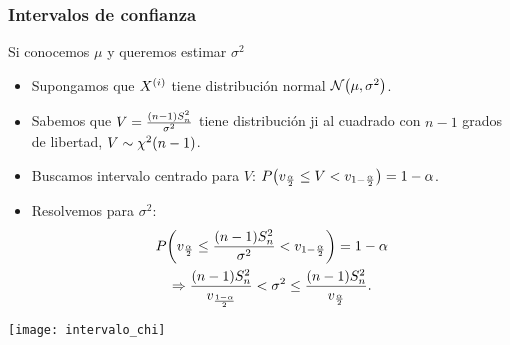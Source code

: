 \documentclass[table]{beamer}
\begin{document}
\begin{frame}
    \frametitle{Intervalos de confianza}
    \begin{block}{Si conocemos $\mu$ y queremos estimar $\sigma^{2}$}
        \begin{itemize}
            \item Supongamos que $X^{\parens{i}}$ tiene distribución normal $\normal{\mu}{\sigma^{2}}$.
            \item Sabemos que $V =  \frac{\parens{n - 1} S^{2}_{n}}{\sigma^{2}}$ tiene distribución ji al cuadrado con $n - 1$ grados de libertad, $V \sim \chidist{n - 1}$.
            \item Buscamos intervalo centrado para $V$: $\prob{v_{\frac{\alpha}{2}} \leq V < v_{1 - \frac{\alpha}{2}}} = 1 - \alpha$.
            \item Resolvemos para $\sigma^{2}$:
                \begin{multline*}
                    \prob{v_{\frac{\alpha}{2}} \leq \frac{\parens{n - 1} S^{2}_{n}}{\sigma^{2}} < v_{1 - \frac{\alpha}{2}}}
                    = 1 - \alpha
                    \\
                    \Rightarrow
                    \frac{\parens{n - 1} S^{2}_{n}}{v_{\frac{1 - \alpha}{2}}} < \sigma^{2} \leq \frac{\parens{n - 1} S^{2}_{n}}{v_{\frac{\alpha}{2}}}
                    .
                \end{multline*}
        \end{itemize}
    \end{block}
    \begin{center}
        \texttt{[image: intervalo\_chi]}
    \end{center}
\end{frame}
\end{document}
